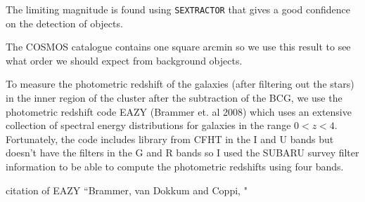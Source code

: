 The limiting magnitude is found using \texttt{SEXTRACTOR} that gives a good confidence on the detection of objects.

The COSMOS catalogue contains one square arcmin so we use this result to see what order  we should expect from background objects.

To measure the photometric redshift of the galaxies (after filtering out the stars) in the inner region of the cluster after the subtraction of the BCG, we use the photometric redshift code EAZY (Brammer et. al 2008) which uses an extensive collection of spectral energy distributions for galaxies in the range $0<z<4$. Fortunately, the code includes library from CFHT in the I and U bands but doesn't have the filters in the G and R bands so I used the SUBARU survey filter information to be able to compute the photometric redshifts using four bands.

citation of EAZY ``Brammer, van Dokkum and Coppi, \citeyear{Reference22}" 

